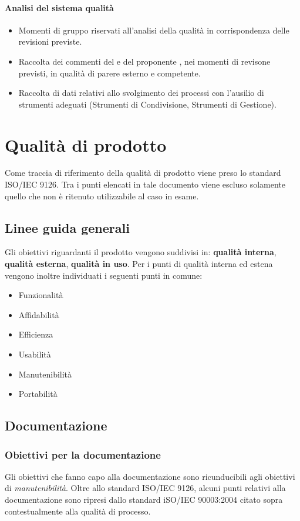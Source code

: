 \documentclass[12pt,a4paper]{article}
\begin{document}
\paragraph{Analisi del sistema qualità}
\begin{itemize}
	\item Momenti di gruppo riservati all'analisi della qualità in corrispondenza delle revisioni previste.
	\item Raccolta dei commenti del \Vardanega e del proponente \Zucchetti, nei momenti di revisone previsti, in qualità di parere esterno e competente.
	\item Raccolta di dati relativi allo svolgimento dei processi con l'ausilio di strumenti adeguati (Strumenti di Condivisione, Strumenti di Gestione).	
\end{itemize}
\section{Qualità di prodotto}
Come traccia di riferimento della qualità di prodotto viene preso lo standard ISO/IEC 9126. Tra i punti elencati in tale documento viene escluso solamente quello che non è ritenuto utilizzabile al caso in esame.
\subsection{Linee guida generali}
Gli obiettivi riguardanti il prodotto vengono suddivisi in: \textbf{qualità interna}, \textbf{qualità esterna}, \textbf{qualità in uso}.
Per i punti di qualità interna ed estena vengono inoltre individuati i seguenti punti in comune:
\begin{itemize}
	\item Funzionalità
	\item Affidabilità
	\item Efficienza
	\item Usabilità
	\item Manutenibilità
	\item Portabilità
\end{itemize}
\subsection{Documentazione}
\subsubsection{Obiettivi per la documentazione}
Gli obiettivi che fanno capo alla documentazione sono ricunducibili agli obiettivi di \textit{manutenibilità}. 
Oltre allo standard ISO/IEC 9126, alcuni punti relativi alla documentazione sono ripresi dallo standard iSO/IEC 90003:2004 citato sopra contestualmente alla qualità di processo.
\end{document}
